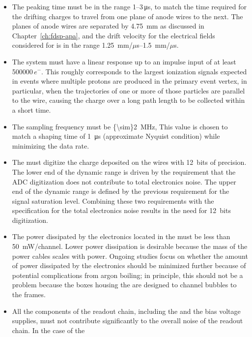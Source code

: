 \begin{itemize}
\item{The  peaking time must be in the range \numrange{1}{3}\,\si{\micro\second},
to match the time required for the drifting charges to travel from one plane of anode
wires to the next. The planes of anode wires are separated by \SI{4.75}{mm}
as discussed in Chapter~\ref{ch:fdsp-apa}, and the drift velocity for
the electrical fields considered for  is in the range
\SIrange{1.25}{1.5}{mm/$\mu$s}.}
\item{The system must have a linear response up to an impulse input of 
at least \num{500000}\,$e^{-}$.  This roughly corresponds to the largest 
ionization signals expected in events where multiple protons are produced 
in the primary event vertex, in particular, when the trajectories of one 
or more of those particles are parallel to the wire, causing the charge 
over a long path length to be collected within a short time.}
\item{The  sampling frequency must be \SI{{\sim}2}{MHz},
This value is chosen to match a  shaping time of \SI{1}{\micro\second} 
(approximate Nyquist condition) while minimizing the data rate.}
\item{The  must digitize the charge deposited on the wires 
with 12~bits of precision.  The lower end of the  dynamic 
range is driven by the requirement that the ADC digitization does not 
contribute to total electronics noise. The upper end of the  
dynamic range is defined by the previous requirement for the signal 
saturation level. Combining these two requirements with the specification 
for the total electronics noise results in the need for 12~bits digitization.}
\item{The power dissipated by the electronics located in the  must
be less than \SI{50}{mW/channel}.  Lower power dissipation is desirable 
because the mass of the power cables scales with  power. Ongoing studies 
focus on whether the amount of power dissipated by the electronics 
should be minimized further because of potential complications from 
argon boiling; in principle, this should not be a problem because the 
 boxes housing the  are designed to channel 
bubbles to the  frames.}
\item{All the components of the readout chain, including the 
and the bias voltage supplies, must not contribute significantly to
the overall noise of the readout chain. In the case of the 
}
\end{itemize}
